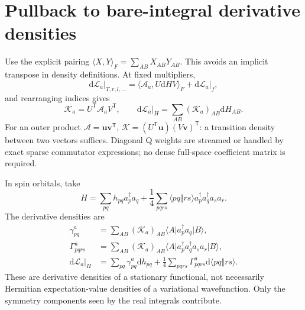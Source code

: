 \documentclass[11pt,letterpaper]{article}
\numberwithin{equation}{section}
\newcommand{\me}[3]{\langle #1\rvert #2\lvert #3\rangle}
\newcommand{\T}{\mathsf T}
\newcommand{\dd}{\mathrm d}
\begin{document}
\section{Pullback to bare-integral derivative densities}
\label{sec:densities}
Use the explicit pairing
$\langle X,Y\rangle_F=\sum_{AB}X_{AB}Y_{AB}$. This avoids an implicit
transpose in density definitions. At fixed multipliers,
\begin{equation}
 \dd\mathcal L_a\big|_{T,r,l,\ldots}
  =\langle\mathcal A_a,U\dd H V\rangle_F+
                                     \dd\mathcal L_a\big|_{f},
\end{equation}
and rearranging indices gives
\begin{equation}
 \boxed{\mathcal K_a=U^{\T}\mathcal A_a V^{\T},\qquad
       \dd\mathcal L_a\big|_H=\sum_{AB}(\mathcal K_a)_{AB}\dd H_{AB}.}
 \label{eq:pullback}
\end{equation}
For an outer product $\mathcal A=\bm u\bm v^{\T}$,
$\mathcal K=(U^{\T}\bm u)(V\bm v)^{\T}$: a transition density between two
vectors suffices. Diagonal Q weights are streamed or handled by exact sparse
commutator expressions; no dense full-space coefficient matrix is required.

In spin orbitals, take
\begin{equation}
 H=\sum_{pq}h_{pq}a_p^\dagger a_q+
   \frac14\sum_{pqrs}\langle pq\Vert rs\rangle
                      a_p^\dagger a_q^\dagger a_s a_r.
 \label{eq:Hsecond}
\end{equation}
The derivative densities are
\begin{align}
 \gamma_{pq}^{a}&=\sum_{AB}(\mathcal K_a)_{AB}
                         \me{A}{a_p^\dagger a_q}{B},\\
 \Gamma_{pqrs}^{a}&=\sum_{AB}(\mathcal K_a)_{AB}
                         \me{A}{a_p^\dagger a_q^\dagger a_s a_r}{B},\\
 \dd\mathcal L_a\big|_H&=\sum_{pq}\gamma_{pq}^{a}\dd h_{pq}
       +\frac14\sum_{pqrs}\Gamma_{pqrs}^{a}\dd\langle pq\Vert rs\rangle.
 \label{eq:spinrdms}
\end{align}
These are derivative densities of a stationary functional, not necessarily
Hermitian expectation-value densities of a variational wavefunction. Only
the symmetry components seen by the real integrals contribute.
\end{document}
